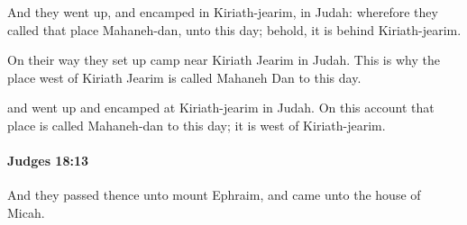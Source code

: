 			\begin{versebox}
					\item[BHS] 
					\item[ASV] And they went up, and encamped in Kiriath-jearim, in Judah: wherefore they called that place Mahaneh-dan, unto this day; behold, it is behind Kiriath-jearim.
					\item[NIV] On their way they set up camp near Kiriath Jearim in Judah. This is why the place west of Kiriath Jearim is called Mahaneh Dan to this day.
					\item[NRSV] and went up and encamped at Kiriath-jearim in Judah. On this account that place is called Mahaneh-dan to this day; it is west of Kiriath-jearim.
			\end{versebox}

		\paragraph{Judges 18:13} %
			\label{JUDGES-18-13}

			And they passed thence unto mount Ephraim, and came unto the house of Micah.

